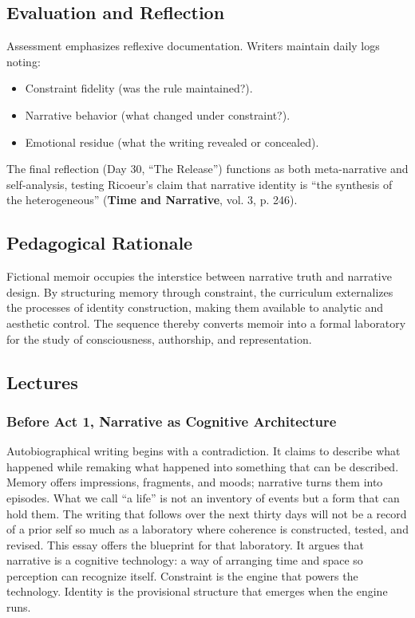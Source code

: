 \documentclass[11pt]{article}
\begin{document}
\subsection*{Evaluation and Reflection}
\label{sec:org7829099}

Assessment emphasizes reflexive documentation. Writers maintain daily logs noting:

\begin{itemize}
\item Constraint fidelity (was the rule maintained?).
\item Narrative behavior (what changed under constraint?).
\item Emotional residue (what the writing revealed or concealed).
\end{itemize}

The final reflection (Day 30, “The Release”) functions as both meta-narrative and self-analysis, testing Ricoeur’s claim that narrative identity is “the synthesis of the heterogeneous” (\textbf{Time and Narrative}, vol. 3, p. 246).
\subsection*{Pedagogical Rationale}
\label{sec:orgaee9b5c}

Fictional memoir occupies the interstice between narrative truth and narrative design. By structuring memory through constraint, the curriculum externalizes the processes of identity construction, making them available to analytic and aesthetic control. The sequence thereby converts memoir into a formal laboratory for the study of consciousness, authorship, and representation.
\subsection*{Lectures}
\label{sec:org70dcbed}
\subsubsection*{Before Act 1, Narrative as Cognitive Architecture}
\label{sec:org400a14e}

Autobiographical writing begins with a contradiction. It claims to describe what happened while remaking what happened into something that can be described. Memory offers impressions, fragments, and moods; narrative turns them into episodes. What we call “a life” is not an inventory of events but a form that can hold them. The writing that follows over the next thirty days will not be a record of a prior self so much as a laboratory where coherence is constructed, tested, and revised. This essay offers the blueprint for that laboratory. It argues that narrative is a cognitive technology: a way of arranging time and space so perception can recognize itself. Constraint is the engine that powers the technology. Identity is the provisional structure that emerges when the engine runs.
\end{document}
